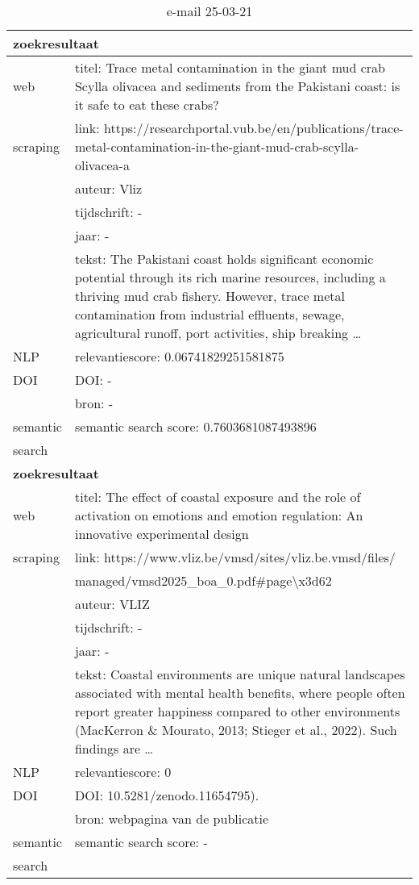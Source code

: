 \begin{table}[h!]
    \caption{e-mail 25-03-21}
    \centering
    \begin{tabularx}{\textwidth}{|p{4cm}|X|} 
        \hline
        \multicolumn{2}{|X|}{\textbf{zoekresultaat}} \\
        \hline
        web &titel: Trace metal contamination in the giant mud crab Scylla olivacea and sediments from the Pakistani coast: is it safe to eat these crabs?\\
        scraping&link: https://researchportal.vub.be/en/publications/trace-metal-contamination-in-the-giant-mud-crab-scylla-olivacea-a\\
        &auteur: Vliz\\
        &tijdschrift: -\\
        &jaar: -\\
        &tekst: The Pakistani coast holds significant economic potential through its rich marine resources, including a thriving mud crab fishery. However, trace metal contamination from industrial effluents, sewage, agricultural runoff, port activities, ship breaking …\\
        \hline
        NLP&relevantiescore: 0.06741829251581875\\
        \hline
        DOI&DOI: -\\
        &bron: -\\
        \hline
        semantic&semantic search score: 0.7603681087493896\\
        search&\\
        \hline
        \multicolumn{2}{|X|}{\textbf{zoekresultaat}} \\
        \hline
        web &titel: The effect of coastal exposure and the role of activation on emotions and emotion regulation: An innovative experimental design\\
        scraping&link: https://www.vliz.be/vmsd/sites/vliz.be.vmsd/files/\\&managed/vmsd2025\_boa\_0.pdf#page\textbackslash x3d62\\
         &auteur: VLIZ\\
        &tijdschrift: -\\
        &jaar: -\\
        &tekst: Coastal environments are unique natural landscapes associated with mental health benefits, where people often report greater happiness compared to other environments (MacKerron \& Mourato, 2013; Stieger et al., 2022). Such findings are …\\
        \hline
        NLP&relevantiescore: 0\\
        \hline
        DOI&DOI: 10.5281/zenodo.11654795).\\
        &bron: webpagina van de publicatie\\
        \hline
        semantic&semantic search score: -\\
        search&\\
        \hline
    \end{tabularx}
    \label{table:email20250321}
\end{table}
